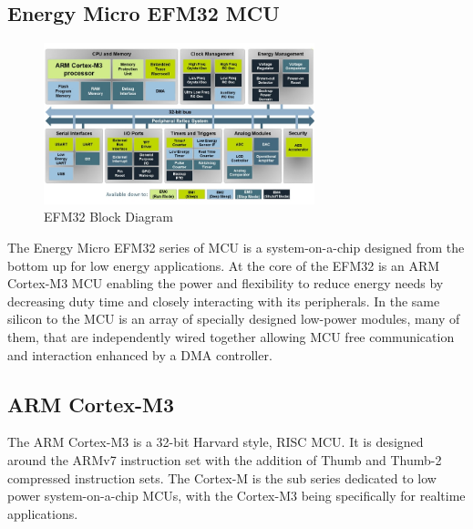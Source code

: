 \subsection{Energy Micro EFM32 \ac{MCU}}

\begin{figure}
  \vspace{-10pt}
  \begin{center}
    \includegraphics[width=0.7\textwidth, keepaspectratio=true]{images/efm32_block_croped.jpg}
  \end{center}
  \caption[EFM32 Block Diagram]{EFM32 Block Diagram \cite{EFM32Tech}}
  \vspace{-10pt}
\end{figure}

The Energy Micro EFM32 series of \ac{MCU} is a system-on-a-chip designed from the bottom
up for low energy applications. At the core of the EFM32 is an ARM Cortex-M3 \ac{MCU} enabling the
power and flexibility to reduce energy needs by decreasing duty time and closely interacting with its
peripherals. In the same silicon to the \ac{MCU} is an array of specially designed low-power modules,
many of them, that are independently wired together allowing \ac{MCU} free communication and
interaction enhanced by a \ac{DMA} controller.

\subsection{ARM Cortex-M3}
The ARM Cortex-M3 is a 32-bit Harvard style, \ac{RISC} \ac{MCU}. It is designed
around the ARMv7 instruction set with the addition of Thumb
and Thumb-2 compressed instruction sets. The Cortex-M is the sub series dedicated to low power
system-on-a-chip \acp{MCU}, with the Cortex-M3 being specifically for realtime applications.


